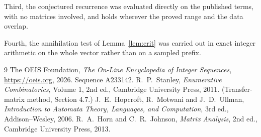 \documentclass[11pt,a4paper]{article}
\theoremstyle{plain}
\theoremstyle{definition}
\begin{document}
Third, the conjectured recurrence was evaluated directly on the published terms, with no
matrices involved, and holds wherever the proved range and the data overlap.

Fourth, the annihilation test of Lemma~\ref{lem:crit} was carried out in exact integer
arithmetic on the whole vector rather than on a sampled prefix.

\begin{thebibliography}{9}
 The OEIS Foundation, \emph{The On-Line Encyclopedia of Integer
Sequences}, \url{https://oeis.org}, 2026. Sequence A233142.
 R.~P.~Stanley, \emph{Enumerative Combinatorics}, Volume 1, 2nd ed.,
Cambridge University Press, 2011. (Transfer-matrix method, Section 4.7.)
 J.~E.~Hopcroft, R.~Motwani and J.~D.~Ullman, \emph{Introduction to Automata
Theory, Languages, and Computation}, 3rd ed., Addison--Wesley, 2006.
 R.~A.~Horn and C.~R.~Johnson, \emph{Matrix Analysis}, 2nd ed., Cambridge
University Press, 2013.
\end{thebibliography}
\end{document}
